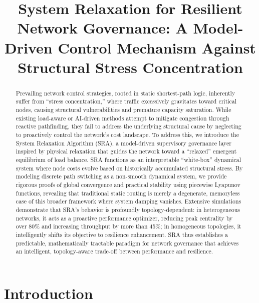 \documentclass{ccjnl}
\title{System Relaxation for Resilient Network Governance: A Model-Driven Control Mechanism Against Structural Stress Concentration}
\begin{document}
\maketitle

\begin{abstract}
Prevailing network control strategies, rooted in static shortest-path logic, inherently suffer from ``stress concentration,'' where traffic excessively gravitates toward critical nodes, causing structural vulnerabilities and premature capacity saturation. While existing load-aware or AI-driven methods attempt to mitigate congestion through reactive pathfinding, they fail to address the underlying structural cause by neglecting to proactively control the network's cost landscape. To address this, we introduce the System Relaxation Algorithm (SRA), a model-driven supervisory governance layer inspired by physical relaxation that guides the network toward a “relaxed” emergent equilibrium of load balance. SRA functions as an interpretable ``white-box'' dynamical system where node costs evolve based on historically accumulated structural stress. By modeling discrete path switching as a non-smooth dynamical system, we provide rigorous proofs of global convergence and practical stability using piecewise Lyapunov functions, revealing that traditional static routing is merely a degenerate, memoryless case of this broader framework where system damping vanishes. Extensive simulations demonstrate that SRA's behavior is profoundly topology-dependent: in heterogeneous networks, it acts as a proactive performance optimizer, reducing peak centrality by over 80\% and increasing throughput by more than 45\%; in homogeneous topologies, it intelligently shifts its objective to resilience enhancement. SRA thus establishes a predictable, mathematically tractable paradigm for network governance that achieves an intelligent, topology-aware trade-off between performance and resilience.
\end{abstract}




\section{Introduction}
\label{sec:introduction}
\end{document}
